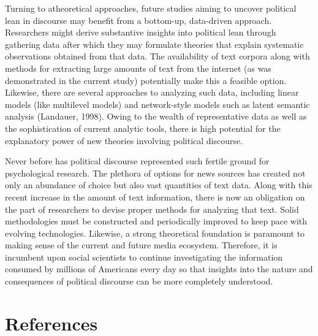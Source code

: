 \documentclass[
  man,floatsintext]{apa6}
\begin{document}
Turning to atheoretical approaches, future studies aiming to uncover
political lean in discourse may benefit from a bottom-up, data-driven
approach. Researchers might derive substantive insights into political
lean through gathering data after which they may formulate theories that
explain systematic observations obtained from that data. The
availability of text corpora along with methods for extracting large
amounts of text from the internet (as was demonstrated in the current
study) potentially make this a feasible option. Likewise, there are
several approaches to analyzing such data, including linear models (like
multilevel models) and network-style models such as latent semantic
analysis (Landauer, 1998). Owing to the wealth of representative data as
well as the sophistication of current analytic tools, there is high
potential for the explanatory power of new theories involving political
discourse.

Never before has political discourse represented such fertile ground for
psychological research. The plethora of options for news sources has
created not only an abundance of choice but also vast quantities of text
data. Along with this recent increase in the amount of text information,
there is now an obligation on the part of researchers to devise proper
methods for analyzing that text. Solid methodologies must be constructed
and periodically improved to keep pace with evolving technologies.
Likewise, a strong theoretical foundation is paramount to making sense
of the current and future media ecosystem. Therefore, it is incumbent
upon social scientists to continue investigating the information
consumed by millions of Americans every day so that insights into the
nature and consequences of political discourse can be more completely
understood.

\newpage

\section{References}\label{references}
\end{document}

